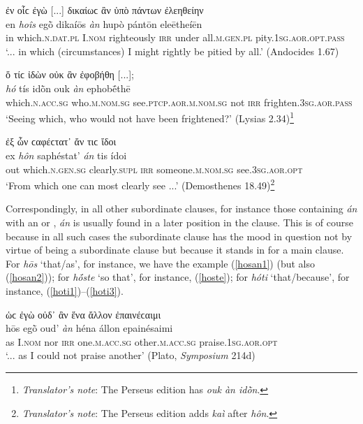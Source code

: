 \begin{exe}
\ex ἐν οἷϲ ἐγὼ {[}...{]} δικαίωϲ ἂν ὑπὸ πάντων ἐλεηθείην\\
\gll en \emph{hoîs} egṑ dikaíōs \emph{àn} hupò pántōn eleētheíēn\\
in which.\textsc{n.dat.pl} I.\textsc{nom} righteously \textsc{irr} under all.\textsc{m.gen.pl} pity.\textsc{1sg.aor.opt.pass}\\
\trans `... in which (circumstances) I might rightly be pitied by all.' (Andocides 1.67)
\label{relan77}
\end{exe}

\begin{exe}
\ex ὅ τίϲ ἰδὼν οὐκ ἂν ἐφοβήθη {[}...{]};\\
\gll \emph{hó} tís idṑn ouk \emph{àn} ephobḗthē\\
which.\textsc{n.acc.sg} who.\textsc{m.nom.sg} see.\textsc{ptcp.aor.m.nom.sg} not \textsc{irr} frighten.\textsc{3sg.aor.pass}\\
\trans `Seeing which, who would not have been frightened?' (Lysias 2.34)\footnote{\emph{Translator's note}: The Perseus edition has \textit{ouk àn idṑn}.}
\label{relan78}
\end{exe}

\begin{exe}
\ex ἐξ ὧν ϲαφέϲτατ᾽ ἄν τιϲ ἴδοι\\
\gll ex \emph{hôn} saphéstat' \emph{án} tis ídoi\\
out which.\textsc{n.gen.sg} clearly.\textsc{supl} \textsc{irr} someone.\textsc{m.nom.sg} see.\textsc{3sg.aor.opt}\\
\trans `From which one can most clearly see ...' (Demosthenes 18.49)\footnote{\emph{Translator's note}: The Perseus edition adds \textit{kaì} after \textit{hôn}.}
\label{relan79}
\end{exe}

Correspondingly, in all other subordinate clauses, for instance those containing \emph{án} with an  or , \emph{án} is usually found in a later position in the clause. This is of course because in all such cases the subordinate clause has the mood in question not by virtue of being a subordinate clause but because it stands in for a main clause. For \emph{hōs} `that/as', for instance, we have the example (\ref{hosan1}) (but also (\ref{hosan2})); for \emph{hṓste} `so that', for instance, (\ref{hoste}); for \emph{hóti} `that/because', for instance, (\ref{hoti1})--(\ref{hoti3}).

\begin{exe}
\ex ὡϲ ἐγὼ οὐδ᾽ ἂν ἕνα ἄλλον ἐπαινέϲαιμι\\
\gll hōs egṑ oud' \emph{àn} héna állon epainésaimi\\
as I.\textsc{nom} nor \textsc{irr} one.\textsc{m.acc.sg} other.\textsc{m.acc.sg} praise.\textsc{1sg.aor.opt}\\
\trans `... as I could not praise another' (Plato, \textit{Symposium} 214d)
\label{hosan1}
\end{exe}

